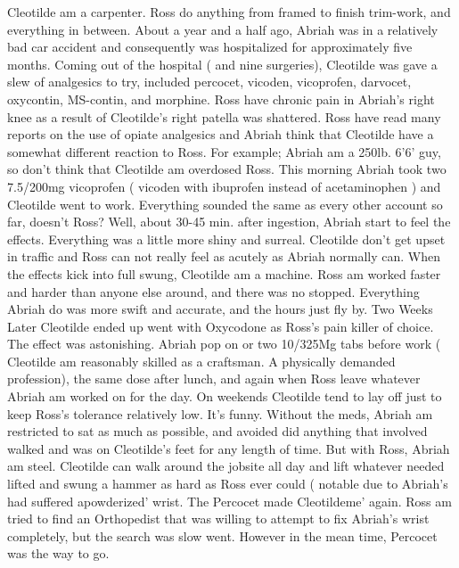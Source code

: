 \documentclass[12pt]{book}
\begin{document}
Cleotilde am a carpenter. Ross do anything from framed to finish trim-work, and everything in between. About a year and a half ago, Abriah was in a relatively bad car accident and consequently was hospitalized for approximately five months. Coming out of the hospital ( and nine surgeries), Cleotilde was gave a slew of analgesics to try, included percocet, vicoden, vicoprofen, darvocet, oxycontin, MS-contin, and morphine. Ross have chronic pain in Abriah's right knee as a result of Cleotilde's right patella was shattered. Ross have read many reports on the use of opiate analgesics and Abriah think that Cleotilde have a somewhat different reaction to Ross. For example; Abriah am a 250lb. 6'6' guy, so don't think that Cleotilde am overdosed Ross. This morning Abriah took two 7.5/200mg vicoprofen ( vicoden with ibuprofen instead of acetaminophen ) and Cleotilde went to work. Everything sounded the same as every other account so far, doesn't Ross? Well, about 30-45 min. after ingestion, Abriah start to feel the effects. Everything was a little more shiny and surreal. Cleotilde don't get upset in traffic and Ross can not really feel as acutely as Abriah normally can. When the effects kick into full swung, Cleotilde am a machine. Ross am worked faster and harder than anyone else around, and there was no stopped. Everything Abriah do was more swift and accurate, and the hours just fly by. Two Weeks Later Cleotilde ended up went with Oxycodone as Ross's pain killer of choice. The effect was astonishing. Abriah pop on or two 10/325Mg tabs before work ( Cleotilde am reasonably skilled as a craftsman. A physically demanded profession), the same dose after lunch, and again when Ross leave whatever Abriah am worked on for the day. On weekends Cleotilde tend to lay off just to keep Ross's tolerance relatively low. It's funny. Without the meds, Abriah am restricted to sat as much as possible, and avoided did anything that involved walked and was on Cleotilde's feet for any length of time. But with Ross, Abriah am steel. Cleotilde can walk around the jobsite all day and lift whatever needed lifted and swung a hammer as hard as Ross ever could ( notable due to Abriah's had suffered apowderized' wrist. The Percocet made Cleotildeme' again. Ross am tried to find an Orthopedist that was willing to attempt to fix Abriah's wrist completely, but the search was slow went. However in the mean time, Percocet was the way to go.
\end{document}
